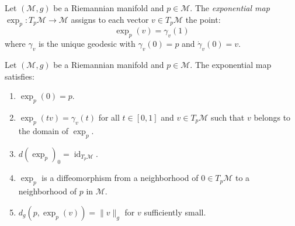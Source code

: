 \begin{definition}\label{def:mapa_exponencial_riemanniano}
Let $(\mathcal{M}, g)$ be a Riemannian manifold and $p \in \mathcal{M}$. The \textit{exponential map} $\exp_p: T_p\mathcal{M} \to \mathcal{M}$ assigns to each vector $v \in T_p\mathcal{M}$ the point:
\[
\exp_p(v) = \gamma_v(1)
\]
where $\gamma_v$ is the unique geodesic with $\gamma_v(0) = p$ and $\dot{\gamma}_v(0) = v$.
\end{definition}

\begin{proposition}\label{prop:propiedades_exp}
Let $(\mathcal{M}, g)$ be a Riemannian manifold and $p \in \mathcal{M}$. The exponential map satisfies:
\begin{enumerate}
	\item $\exp_p(0) = p$.
	\item $\exp_p(tv) = \gamma_v(t)$ for all $t \in [0,1]$ and $v \in T_p\mathcal{M}$ such that $v$ belongs to the domain of $\exp_p$.
	\item $d(\exp_p)_0 = \operatorname{id}_{T_p\mathcal{M}}$.
	\item $\exp_p$ is a diffeomorphism from a neighborhood of $0 \in T_p\mathcal{M}$ to a neighborhood of $p$ in $\mathcal{M}$.
	\item $d_g(p, \exp_p(v)) = \|v\|_g$ for $v$ sufficiently small.
\end{enumerate}
\end{proposition}

